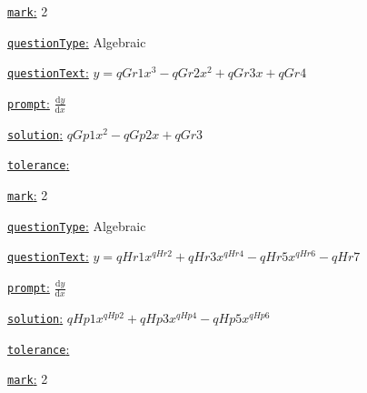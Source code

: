 \documentclass[preview]{standalone}
\newcommand \fieldname[1]{\underline{\texttt{#1}:}}
\begin{document}
\fieldname{mark}
2

\fieldname{questionType}
Algebraic

\fieldname{questionText}
$y = {qGr1}x^3 - {qGr2}x^2 + {qGr3}x + {qGr4}$

\fieldname{prompt}
$\frac{\textrm{d}y}{\textrm{d}x}$

\fieldname{solution}
${qGp1}x^2 - {qGp2}x + {qGr3}$

\fieldname{tolerance}


\fieldname{mark}
2

\fieldname{questionType}
Algebraic

\fieldname{questionText}
$y = {qHr1}x^{qHr2} + {qHr3}x^{qHr4} - {qHr5}x^{qHr6} - {qHr7}$

\fieldname{prompt}
$\frac{\textrm{d}y}{\textrm{d}x}$

\fieldname{solution}
${qHp1}x^{qHp2} + {qHp3}x^{qHp4} - {qHp5}x^{qHp6}$

\fieldname{tolerance}


\fieldname{mark}
2

\end{document}
